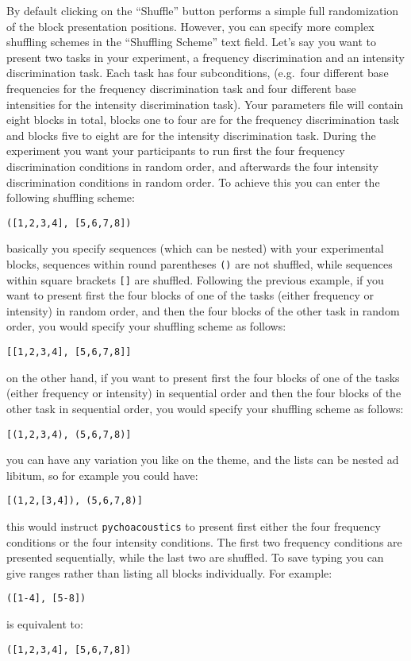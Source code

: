 By default clicking on the ``Shuffle'' button performs a simple full randomization of the block presentation positions.
However, you can specify more complex shuffling schemes in the ``Shuffling Scheme'' text field. Let's say you want to
present two tasks in your experiment, a frequency discrimination and an intensity discrimination task. Each task
has four subconditions, (e.g.\ four different base frequencies for the frequency discrimination task and four
different base intensities for the intensity discrimination task). Your parameters file will contain eight blocks in total,
blocks one to four are for the frequency discrimination task and blocks five to eight are for the intensity discrimination task.
During the experiment you want your participants to run first the four frequency discrimination conditions in random order, and afterwards the
four intensity discrimination conditions in random order. To achieve this you can enter the following shuffling scheme:
\begin{verbatim}
([1,2,3,4], [5,6,7,8])
\end{verbatim}
basically you specify sequences (which can be nested) with your experimental blocks, sequences within round parentheses \texttt{()} are
not shuffled, while sequences within square brackets \texttt{[]} are shuffled. Following the previous example, if you want to present
first the four blocks of one of the tasks (either frequency or intensity) in random order, and then the four blocks of the other task
in random order, you would specify your shuffling scheme as follows:
\begin{verbatim}
[[1,2,3,4], [5,6,7,8]]
\end{verbatim}
on the other hand, if you want to present first the four blocks of one of the tasks (either frequency or intensity)
in sequential order and then the four blocks of the other task in sequential order, you would specify your shuffling scheme
as follows:
\begin{verbatim}
[(1,2,3,4), (5,6,7,8)]
\end{verbatim}
you can have any variation you like on the theme, and the lists can be nested ad libitum, so for example
you could have:
\begin{verbatim}
[(1,2,[3,4]), (5,6,7,8)]
\end{verbatim}
this would instruct \texttt{pychoacoustics} to present first either the four frequency conditions
or the four intensity conditions. The first two frequency conditions are presented sequentially,
while the last two are shuffled. To save typing you can give ranges rather than listing all blocks individually.
For example:
\begin{verbatim}
([1-4], [5-8])
\end{verbatim}
is equivalent to:
\begin{verbatim}
([1,2,3,4], [5,6,7,8])
\end{verbatim}






